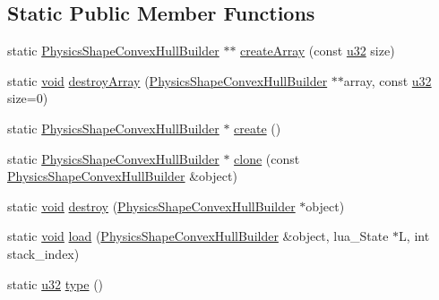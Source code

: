 \subsection*{Static Public Member Functions}
\begin{DoxyCompactItemize}
\item 
static \mbox{\hyperlink{classnjli_1_1_physics_shape_convex_hull_builder}{Physics\+Shape\+Convex\+Hull\+Builder}} $\ast$$\ast$ \mbox{\hyperlink{classnjli_1_1_physics_shape_convex_hull_builder_a0f30f085beeff40b964adf704c5621fb}{create\+Array}} (const \mbox{\hyperlink{_util_8h_a10e94b422ef0c20dcdec20d31a1f5049}{u32}} size)
\item 
static \mbox{\hyperlink{_thread_8h_af1e856da2e658414cb2456cb6f7ebc66}{void}} \mbox{\hyperlink{classnjli_1_1_physics_shape_convex_hull_builder_a46350533a0425e6e6b6627eba62a535b}{destroy\+Array}} (\mbox{\hyperlink{classnjli_1_1_physics_shape_convex_hull_builder}{Physics\+Shape\+Convex\+Hull\+Builder}} $\ast$$\ast$array, const \mbox{\hyperlink{_util_8h_a10e94b422ef0c20dcdec20d31a1f5049}{u32}} size=0)
\item 
static \mbox{\hyperlink{classnjli_1_1_physics_shape_convex_hull_builder}{Physics\+Shape\+Convex\+Hull\+Builder}} $\ast$ \mbox{\hyperlink{classnjli_1_1_physics_shape_convex_hull_builder_af4eb31ef7cd00ad25d31c7eb67cea173}{create}} ()
\item 
static \mbox{\hyperlink{classnjli_1_1_physics_shape_convex_hull_builder}{Physics\+Shape\+Convex\+Hull\+Builder}} $\ast$ \mbox{\hyperlink{classnjli_1_1_physics_shape_convex_hull_builder_a575339a2be728a169b8eb6ec2aa15255}{clone}} (const \mbox{\hyperlink{classnjli_1_1_physics_shape_convex_hull_builder}{Physics\+Shape\+Convex\+Hull\+Builder}} \&object)
\item 
static \mbox{\hyperlink{_thread_8h_af1e856da2e658414cb2456cb6f7ebc66}{void}} \mbox{\hyperlink{classnjli_1_1_physics_shape_convex_hull_builder_a14327ed45eea52c4c0149b2d79d4603a}{destroy}} (\mbox{\hyperlink{classnjli_1_1_physics_shape_convex_hull_builder}{Physics\+Shape\+Convex\+Hull\+Builder}} $\ast$object)
\item 
static \mbox{\hyperlink{_thread_8h_af1e856da2e658414cb2456cb6f7ebc66}{void}} \mbox{\hyperlink{classnjli_1_1_physics_shape_convex_hull_builder_ab016cc01e763bcba040840b98a80690c}{load}} (\mbox{\hyperlink{classnjli_1_1_physics_shape_convex_hull_builder}{Physics\+Shape\+Convex\+Hull\+Builder}} \&object, lua\+\_\+\+State $\ast$L, int stack\+\_\+index)
\item 
static \mbox{\hyperlink{_util_8h_a10e94b422ef0c20dcdec20d31a1f5049}{u32}} \mbox{\hyperlink{classnjli_1_1_physics_shape_convex_hull_builder_aad6a6c1a62f556a45dbee87c8a4ac9ee}{type}} ()
\end{DoxyCompactItemize}
